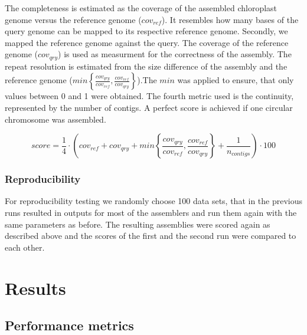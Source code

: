 \documentclass{bmcart}
\begin{document}
The completeness is estimated as the coverage of the assembled chloroplast genome versus the reference genome ($cov_{ref}$). It resembles how many bases of the query genome can be mapped to its respective reference genome. Secondly, we mapped the reference genome against the query. The coverage of the reference genome ($cov_{qry}$) is used as measurment for the correctness of the assembly. The repeat resolution is estimated from the size difference of the assembly and the reference genome ($min\left\{ \frac{cov_{qry}}{cov_{ref}}, \frac{cov_{ref}}{cov_{qry}}\right\}$).The $min$ was applied to ensure, that only values between 0 and 1 were obtained. The fourth metric used is the continuity, represented by the number of contigs. A perfect score is achieved if one circular chromosome was assembled.



\begin{equation}
   score = \frac{1}{4} \cdot \left( cov_{ref} +  cov_{qry} + min\left\{ \frac{cov_{qry}}{cov_{ref}}, \frac{cov_{ref}}{cov_{qry}}\right\} + \frac{1}{n_{contigs} }\right) \cdot 100 
   \label{eq:quantitative}
\end{equation}



\subsubsection*{Reproducibility}
For reproducibility  testing we randomly choose  \num{100} data sets, that in the previous runs resulted in outputs for most of the assemblers and run them again with the same parameters as before. The resulting assemblies were scored again as described above and the scores of the first and the second run were compared to each other. 

\section*{Results}
\subsection*{Performance metrics}
\end{document}
